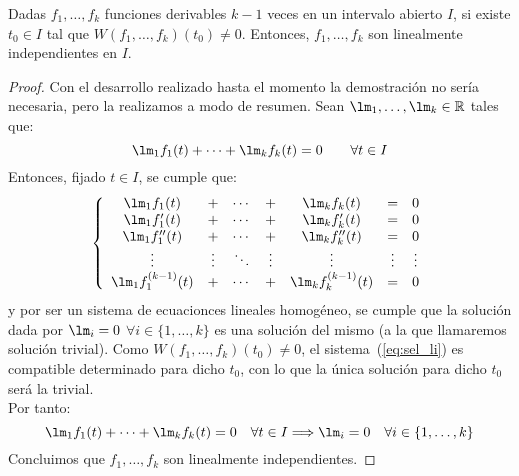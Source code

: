 \begin{prop}\label{prop:Wronskiano}
    Dadas $f_1,\ldots,f_k$ funciones derivables $k-1$ veces en un intervalo abierto $I$, si existe $t_0\in I$ tal que $W(f_1,\ldots,f_k)(t_0) \neq 0$. Entonces, $f_1,\ldots,f_k$ son linealmente independientes en $I$.
    \begin{proof}
        Con el desarrollo realizado hasta el momento la demostración no sería necesaria, pero la realizamos a modo de resumen.\newline
        Sean $\lm_1,\ldots,\lm_k\in \mathbb{R}$ tales que:
        \begin{equation*}
            \lm_1f_1(t) + \cdots + \lm_k f_k(t) = 0 \qquad \forall t\in I
        \end{equation*}
        Entonces, fijado $t\in I$, se cumple que:
        \begin{equation}\label{eq:sel_li}
            \left\{\begin{array}{ccccccc}
                    \lm_1 f_1(t) &+& \cdots &+& \lm_k f_k(t) &=& 0 \\
                    \lm_1 f_1'(t) &+& \cdots &+& \lm_k f_k'(t) &=& 0 \\
                    \lm_1 f_1''(t) &+& \cdots &+& \lm_k f_k''(t) &=& 0 \\
                    \vdots & \vdots & \ddots & \vdots & \vdots & \vdots & \vdots \\
                    \lm_1 f_1^{(k-1)}(t) &+& \cdots &+& \lm_k f_k^{(k-1)}(t) &=& 0 
            \end{array}\right.
        \end{equation}
        y por ser un sistema de ecuacionces lineales homogéneo, se cumple que la solución dada por $\lm_i = 0$ $\forall i \in \{1,\ldots,k\}$ es una solución del mismo (a la que llamaremos solución trivial). Como $W(f_1,\ldots,f_k)(t_0)\neq 0$, el sistema~(\ref{eq:sel_li}) es compatible determinado para dicho $t_0$, con lo que la única solución para dicho $t_0$ será la trivial.\\

        Por tanto:
        \begin{equation*}
            \lm_1f_1(t) + \cdots + \lm_k f_k(t) = 0 \quad \forall t\in I \Longrightarrow \lm_i = 0 \quad \forall i \in \{1,\ldots,k\}
        \end{equation*}
        Concluimos que $f_1,\ldots,f_k$ son linealmente independientes.
    \end{proof}
\end{prop}

